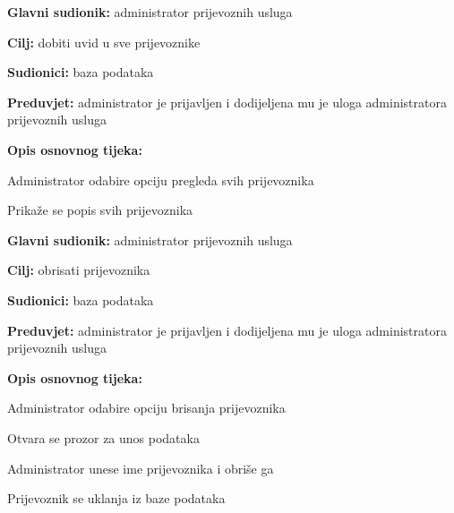                         \noindent {}
					\begin{packed_item}
	
						\item \textbf{Glavni sudionik: }administrator prijevoznih usluga
						\item  \textbf{Cilj:} dobiti uvid u sve prijevoznike
						\item  \textbf{Sudionici:} baza podataka
						\item  \textbf{Preduvjet:} administrator je prijavljen i dodijeljena mu je uloga administratora prijevoznih usluga
						\item  \textbf{Opis osnovnog tijeka:}
						
						\item[] \begin{packed_enum}
	
							\item Administrator odabire opciju pregleda svih prijevoznika
							\item Prikaže se popis svih prijevoznika
							
						\end{packed_enum}
						
					\end{packed_item}


                        \noindent {}
					\begin{packed_item}
	
						\item \textbf{Glavni sudionik: }administrator prijevoznih usluga
						\item  \textbf{Cilj:} obrisati prijevoznika
						\item  \textbf{Sudionici:} baza podataka
						\item  \textbf{Preduvjet:} administrator je prijavljen i dodijeljena mu je uloga administratora prijevoznih usluga
						\item  \textbf{Opis osnovnog tijeka:}
						
						\item[] \begin{packed_enum}
	
							\item Administrator odabire opciju brisanja prijevoznika
							\item Otvara se prozor za unos podataka
                                \item Administrator unese ime prijevoznika i obriše ga
                                \item Prijevoznik se uklanja iz baze podataka
						\end{packed_enum}
						
					\end{packed_item}


